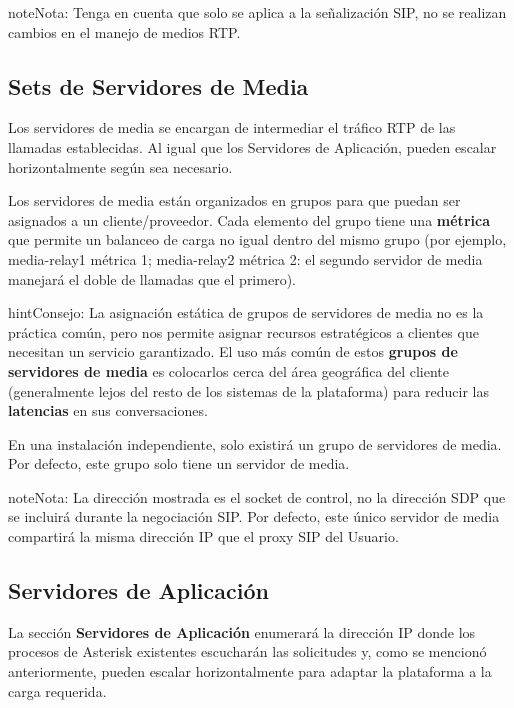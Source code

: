 \documentclass[letterpaper,10pt,spanish]{sphinxmanual}
\begin{document}
\begin{notice}{note}{Nota:}
Tenga en cuenta que solo se aplica a la señalización SIP, no se realizan cambios en el manejo de medios RTP.
\end{notice}


\subsection{Sets de Servidores de Media}
\label{administration_portal/platform/infrastructure/media_relay_sets::doc}\label{administration_portal/platform/infrastructure/media_relay_sets:media-relay-sets}
Los servidores de media se encargan de intermediar el tráfico RTP de las llamadas establecidas. Al igual que los Servidores de Aplicación, pueden escalar horizontalmente según sea necesario.

Los servidores de media están organizados en grupos para que puedan ser asignados a un cliente/proveedor. Cada elemento del grupo tiene una \textbf{métrica} que permite un balanceo de carga no igual dentro del mismo grupo (por ejemplo, media-relay1 métrica 1; media-relay2 métrica 2: el segundo servidor de media manejará el doble de llamadas que el primero).

\begin{notice}{hint}{Consejo:}
La asignación estática de grupos de servidores de media no es la práctica común, pero nos permite asignar recursos estratégicos a clientes que necesitan un servicio garantizado. El uso más común de estos \textbf{grupos de servidores de media} es colocarlos cerca del área geográfica del cliente (generalmente lejos del resto de los sistemas de la plataforma) para reducir las \textbf{latencias} en sus conversaciones.
\end{notice}

En una instalación independiente, solo existirá un grupo de servidores de media. Por defecto, este grupo solo tiene un servidor de media.

\begin{notice}{note}{Nota:}
La dirección mostrada es el socket de control, no la dirección SDP que se incluirá durante la negociación SIP. Por defecto, este único servidor de media compartirá la misma dirección IP que el proxy SIP del Usuario.
\end{notice}


\subsection{Servidores de Aplicación}
\label{administration_portal/platform/infrastructure/application_servers::doc}\label{administration_portal/platform/infrastructure/application_servers:application-servers}
La sección \textbf{Servidores de Aplicación} enumerará la dirección IP donde los procesos de Asterisk existentes escucharán las solicitudes y, como se mencionó anteriormente, pueden escalar horizontalmente para adaptar la plataforma a la carga requerida.
\end{document}
